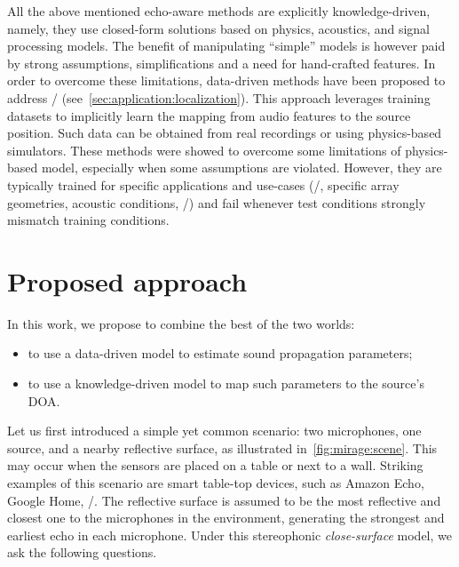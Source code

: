 \mynewline
All the above mentioned echo-aware methods are explicitly knowledge-driven, namely, they use closed-form solutions based on physics, acoustics, and signal processing models.
The benefit of manipulating ``simple'' models is however paid by strong assumptions, simplifications and a need for hand-crafted features.
In order to overcome these limitations, data-driven methods have been proposed to address \SSL/ (see~\cref{sec:application:localization}).
This approach leverages  training datasets to implicitly learn the mapping from audio features to the source position.
Such data can be obtained from real recordings or using physics-based simulators.
These methods were showed to overcome some limitations of physics-based model, especially when some assumptions are violated.
However, they are typically trained for specific applications and use-cases (\eg/, specific array geometries, acoustic conditions, \etc/) and fail whenever test conditions strongly mismatch training conditions.

\section{Proposed approach}
In this work, we propose to combine the best of the two worlds:
\begin{itemize}
    \item to use a data-driven model to estimate sound propagation parameters;
    \item to use a knowledge-driven model to map such parameters to the source's \ac{DOA}.
\end{itemize}
Let us first introduced a simple yet common scenario:
two microphones, one source, and a nearby reflective surface, as illustrated in~\cref{fig:mirage:scene}.
This may occur when the sensors are placed on a table or next to a wall.
Striking examples of this scenario are smart table-top devices, such as Amazon Echo, Google Home, \etc/.
The reflective surface is assumed to be the most reflective and closest one to the microphones in the environment, generating the strongest and earliest echo in each microphone.
Under this stereophonic \textit{close-surface} model, we ask the following questions.

